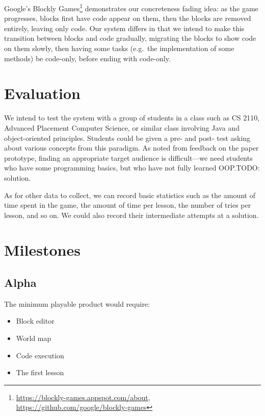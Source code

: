 \documentclass[12pt,notitlepage]{article}
\begin{document}
Google's Blockly
Games\footnote{\url{https://blockly-games.appspot.com/about},
  \url{https://github.com/google/blockly-games}} demonstrates our
concreteness fading idea: as the game progresses, blocks first have
code appear on them, then the blocks are removed entirely, leaving
only code. Our system differs in that we intend to make this
transition between blocks and code gradually, migrating the blocks to
show code on them slowly, then having some tasks (e.g.\ the
implementation of some methods) be code-only, before ending with
code-only.

\section{Evaluation}

We intend to test the system with a group of students in a class such
as CS 2110, Advanced Placement Computer Science, or similar class
involving Java and object-oriented principles. Students could be given
a pre- and post- test asking about various concepts from this
paradigm. As noted from feedback on the paper prototype, finding an
appropriate target audience is difficult---we need students who have
some programming basics, but who have not fully learned OOP.\@ TODO:
solution.

As for other data to collect, we can record basic statistics such as
the amount of time spent in the game, the amount of time per lesson,
the number of tries per lesson, and so on. We could also record their
intermediate attempts at a solution.

\section{Milestones}

\subsection{Alpha}

The minimum playable product would require:
\begin{itemize}
\item Block editor
\item World map
\item Code execution
\item The first lesson
\end{itemize}
\end{document}

